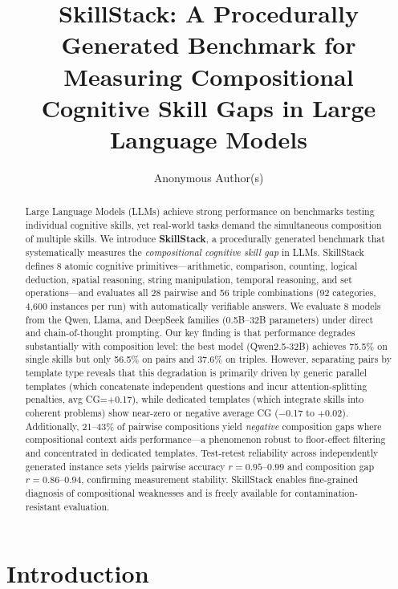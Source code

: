 \documentclass{article}
\title{SkillStack: A Procedurally Generated Benchmark for Measuring Compositional Cognitive Skill Gaps in Large Language Models}
\author{
  Anonymous Author(s)
}
\begin{document}
\maketitle

\begin{abstract}
Large Language Models (LLMs) achieve strong performance on benchmarks testing individual cognitive skills, yet real-world tasks demand the simultaneous composition of multiple skills. We introduce \textbf{SkillStack}, a procedurally generated benchmark that systematically measures the \emph{compositional cognitive skill gap} in LLMs. SkillStack defines 8 atomic cognitive primitives---arithmetic, comparison, counting, logical deduction, spatial reasoning, string manipulation, temporal reasoning, and set operations---and evaluates all 28 pairwise and 56 triple combinations (92 categories, 4{,}600 instances per run) with automatically verifiable answers. We evaluate 8 models from the Qwen, Llama, and DeepSeek families (0.5B--32B parameters) under direct and chain-of-thought prompting.
Our key finding is that performance degrades substantially with composition level: the best model (Qwen2.5-32B) achieves 75.5\% on single skills but only 56.5\% on pairs and 37.6\% on triples. However, separating pairs by template type reveals that this degradation is primarily driven by generic parallel templates (which concatenate independent questions and incur attention-splitting penalties, avg CG=+0.17), while dedicated templates (which integrate skills into coherent problems) show near-zero or negative average CG ($-$0.17 to $+$0.02). Additionally, 21--43\% of pairwise compositions yield \emph{negative} composition gaps where compositional context aids performance---a phenomenon robust to floor-effect filtering and concentrated in dedicated templates. Test-retest reliability across independently generated instance sets yields pairwise accuracy $r=0.95$--$0.99$ and composition gap $r=0.86$--$0.94$, confirming measurement stability. SkillStack enables fine-grained diagnosis of compositional weaknesses and is freely available for contamination-resistant evaluation.
\end{abstract}

\section{Introduction}
\label{sec:intro}
\end{document}
